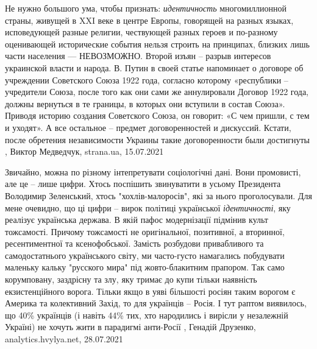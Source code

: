 Не нужно большого ума, чтобы признать: \emph{идентичность} многомиллионной
страны, живущей в XXI веке в центре Европы, говорящей на разных языках,
исповедующей разные религии, чествующей разных героев и по-разному оценивающей
исторические события нельзя строить на принципах, близких лишь части населения
— НЕВОЗМОЖНО.  Второй изъян – разрыв интересов украинской власти и народа.  В.
Путин в своей статье напоминает о договоре об учреждении Советского Союза 1922
года, согласно которому «республики – учредители Союза, после того как они сами
же аннулировали Договор 1922 года, должны вернуться в те границы, в которых они
вступили в состав Союза». Приводя историю создания Советского Союза, он
говорит: «С чем пришли, с тем и уходят». А все остальное – предмет
договоренностей и дискуссий. Кстати, после обретения независимости Украины
такие договоренности были достигнуты
, 
Виктор Медведчук, strana.ua, 15.07.2021

Звичайно, можна по різному інтепретувати соціологічні дані. Вони промовисті,
але це – лише цифри. Хтось поспішить звинуватити в усьому Президента Володимир
Зеленський, хтось "хохлів-малоросів", які за нього проголосували. Для мене
очевидно, що ці цифри – вирок політиці української \emph{ідентичності}, яку
реалізує українська держава. В якій пафос модернізації підмінив культ
тожсамості.  Причому тожсамості не оригінальної, позитивної, а вторинної,
ресентиментної та ксенофобської.  Замість розбудови привабливого та
самодостатнього українського світу, ми часто-густо намагались побудувати
маленьку кальку "русского мира" під жовто-блакитним прапором. Так само
корумповану, заздрісну та злу, яку тримає до купи тільки наявність
екзистенційного ворога. Тільки якщо в уяві більшості росіян таким ворогом є
Америка та колективний Захід, то для українців – Росія.  І тут раптом
виявилось, що 40\% українців (і навіть 44\% тих, хто народились і вирісли у
незалежній Україні) не хочуть жити в парадигмі анти-Росії
, 
Генадій Друзенко, analytics.hvylya.net, 28.07.2021
